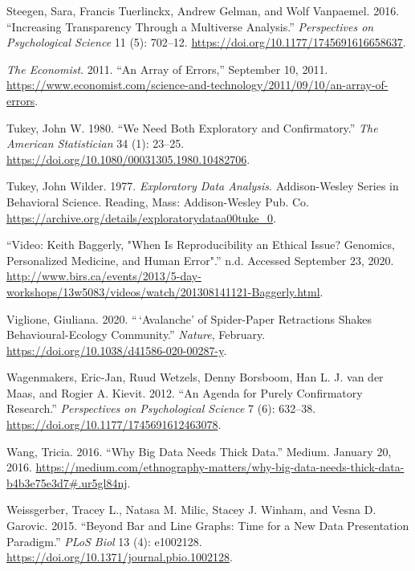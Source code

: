 \documentclass[
]{article}
\newlength{\cslhangindent}
\newenvironment{cslreferences}%
  {\setlength{\parindent}{0pt}%
  \everypar{\setlength{\hangindent}{\cslhangindent}}\ignorespaces}%
  {\par}
\begin{document}
\begin{cslreferences}
\leavevmode\hypertarget{ref-SteegenIncreasingTransparencyMultiverse2016}{}%
Steegen, Sara, Francis Tuerlinckx, Andrew Gelman, and Wolf Vanpaemel. 2016. ``Increasing Transparency Through a Multiverse Analysis.'' \emph{Perspectives on Psychological Science} 11 (5): 702--12. \url{https://doi.org/10.1177/1745691616658637}.

\leavevmode\hypertarget{ref-ArrayErrors2011}{}%
\emph{The Economist}. 2011. ``An Array of Errors,'' September 10, 2011. \url{https://www.economist.com/science-and-technology/2011/09/10/an-array-of-errors}.

\leavevmode\hypertarget{ref-TukeyWeNeedBoth1980}{}%
Tukey, John W. 1980. ``We Need Both Exploratory and Confirmatory.'' \emph{The American Statistician} 34 (1): 23--25. \url{https://doi.org/10.1080/00031305.1980.10482706}.

\leavevmode\hypertarget{ref-TukeyExploratoryDataAnalysis1977}{}%
Tukey, John Wilder. 1977. \emph{Exploratory Data Analysis}. Addison-Wesley Series in Behavioral Science. Reading, Mass: Addison-Wesley Pub. Co. \url{https://archive.org/details/exploratorydataa00tuke_0}.

\leavevmode\hypertarget{ref-VideoKeithBaggerly}{}%
``Video: Keith Baggerly, "When Is Reproducibility an Ethical Issue? Genomics, Personalized Medicine, and Human Error".'' n.d. Accessed September 23, 2020. \url{http://www.birs.ca/events/2013/5-day-workshops/13w5083/videos/watch/201308141121-Baggerly.html}.

\leavevmode\hypertarget{ref-ViglioneAvalancheSpiderpaperRetractions2020}{}%
Viglione, Giuliana. 2020. ``\,`Avalanche' of Spider-Paper Retractions Shakes Behavioural-Ecology Community.'' \emph{Nature}, February. \url{https://doi.org/10.1038/d41586-020-00287-y}.

\leavevmode\hypertarget{ref-WagenmakersAgendaPurelyConfirmatory2012}{}%
Wagenmakers, Eric-Jan, Ruud Wetzels, Denny Borsboom, Han L. J. van der Maas, and Rogier A. Kievit. 2012. ``An Agenda for Purely Confirmatory Research.'' \emph{Perspectives on Psychological Science} 7 (6): 632--38. \url{https://doi.org/10.1177/1745691612463078}.

\leavevmode\hypertarget{ref-WangWhyBigData2016}{}%
Wang, Tricia. 2016. ``Why Big Data Needs Thick Data.'' Medium. January 20, 2016. \url{https://medium.com/ethnography-matters/why-big-data-needs-thick-data-b4b3e75e3d7\#.ur5gl84nj}.

\leavevmode\hypertarget{ref-WeissgerberBarLineGraphs2015}{}%
Weissgerber, Tracey L., Natasa M. Milic, Stacey J. Winham, and Vesna D. Garovic. 2015. ``Beyond Bar and Line Graphs: Time for a New Data Presentation Paradigm.'' \emph{PLoS Biol} 13 (4): e1002128. \url{https://doi.org/10.1371/journal.pbio.1002128}.


\end{cslreferences}
\end{document}
